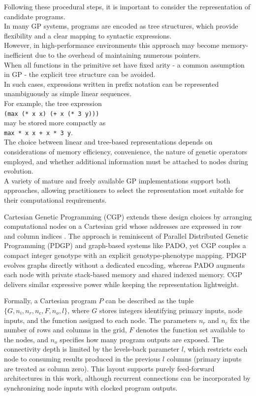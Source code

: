 \documentclass[12pt,a4paper]{report}
\begin{document}
Following these procedural steps, it is important to consider the representation of candidate programs. \\
In many GP systems, programs are encoded as tree structures, which provide flexibility and a clear mapping to syntactic expressions. \\
However, in high-performance environments this approach may become memory-inefficient due to the overhead of maintaining numerous pointers. \\
When all functions in the primitive set have fixed arity - a common assumption in GP - the explicit tree structure can be avoided. \\
In such cases, expressions written in prefix notation can be represented unambiguously as simple linear sequences. \\
For example, the tree expression \\
\texttt{(max (* x x) (+ x (* 3 y)))} \\
may be stored more compactly as \\
\texttt{max * x x + x * 3 y}. \\
The choice between linear and tree-based representations depends on considerations of memory efficiency, convenience, the nature of genetic operators employed, and whether additional information must be attached to nodes during evolution. \\
A variety of mature and freely available GP implementations support both approaches, allowing practitioners to select the representation most suitable for their computational requirements.

\par Cartesian Genetic Programming (CGP) extends these design choices by arranging computational nodes on a Cartesian grid whose addresses are expressed in row and column indices \cite{miller2000}. The approach is reminiscent of Parallel Distributed Genetic Programming (PDGP) and graph-based systems like PADO, yet CGP couples a compact integer genotype with an explicit genotype-phenotype mapping. PDGP evolves graphs directly without a dedicated encoding, whereas PADO augments each node with private stack-based memory and shared indexed memory. CGP delivers similar expressive power while keeping the representation lightweight.

\par Formally, a Cartesian program \(P\) can be described as the tuple \(\{G, n_i, n_r, n_c, F, n_o, l\}\), where \(G\) stores integers identifying primary inputs, node inputs, and the function assigned to each node. The parameters \(n_r\) and \(n_c\) fix the number of rows and columns in the grid, \(F\) denotes the function set available to the nodes, and \(n_o\) specifies how many program outputs are exposed. The connectivity depth is limited by the levels-back parameter \(l\), which restricts each node to consuming results produced in the previous \(l\) columns (primary inputs are treated as column zero). This layout supports purely feed-forward architectures in this work, although recurrent connections can be incorporated by synchronizing node inputs with clocked program outputs.
\end{document}
